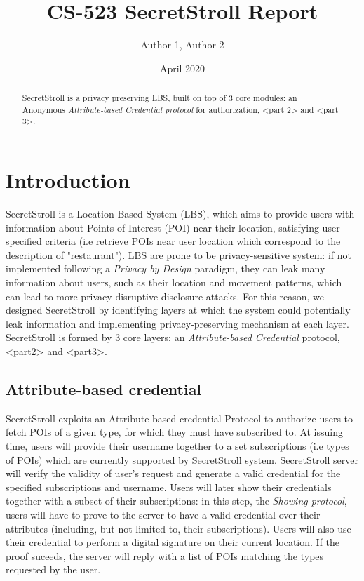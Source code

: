 \documentclass[10pt,conference,compsocconf]{IEEEtran}
\title{CS-523 SecretStroll Report}
\author{Author 1, Author 2}
\date{April 2020}
\begin{document}
\maketitle

\begin{abstract}
    SecretStroll is a privacy preserving LBS, built on top of 3 core modules: an
    Anonymous \textit{Attribute-based Credential protocol} for authorization,
    <part 2> and <part 3>.
\end{abstract}

\section{Introduction}
SecretStroll is a Location Based System (LBS), which aims to provide users with
information about Points of Interest (POI) near their location, satisfying
user-specified criteria (i.e retrieve POIs near user location which correspond
to the description of "restaurant").\newline
LBS are prone to be privacy-sensitive system: if not implemented following a
\textit{Privacy by Design} paradigm, they can leak many information about users,
such as their location and movement patterns, which can lead to more
privacy-disruptive disclosure attacks. For this reason, we designed SecretStroll
by identifying layers at which the system could potentially leak information and
implementing privacy-preserving mechanism at each layer.\newline
SecretStroll is formed by 3 core layers: an \textit{Attribute-based Credential}
protocol, <part2> and <part3>.
\subsection{Attribute-based credential}
SecretStroll exploits an Attribute-based credential Protocol to authorize users
to fetch POIs of a given type, for which they must have subscribed to. At
issuing time, users will provide their username together to a set subscriptions
(i.e types of POIs) which are currently supported by SecretStroll system.
SecretStroll server will verify the validity of user's request and generate a
valid credential for the specified subscriptions and username. Users will later
show their credentials together with a subset of their subscriptions: in this
step, the \textit{Showing protocol}, users will have to prove to the server to
have a valid credential over their attributes (including, but not limited to,
their subscriptions). Users will also use their credential to perform a digital
signature on their current location. If the proof suceeds, the server will reply
with a list of POIs matching the types requested by the user.
\end{document}

